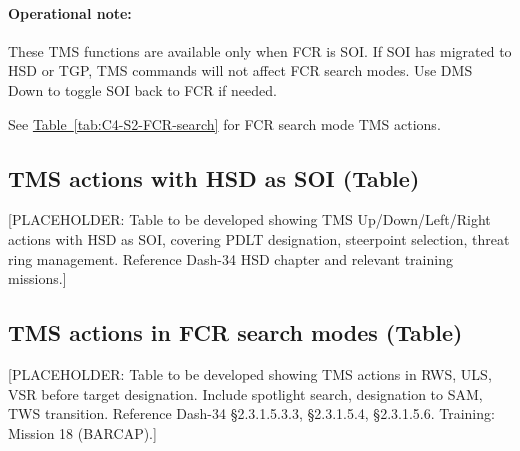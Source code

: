 \documentclass[11pt, a4paper, twoside]{report}
\newenvironment{hotastable}[1]{%
	\footnotesize
	\setlength{\tabcolsep}{3pt}
	\renewcommand{\arraystretch}{1.35}
	\begin{longtable}{L{1.00cm} L{0.90cm} L{0.90cm} L{3.30cm} L{6.40cm} L{1.40cm} L{1.60cm}}
		\caption{#1}\label{table.\thetable}\\
		\noalign{\addtocontents{hotas}{\protect\contentsline{table}{\protect\numberline{\thetable}#1}{\thepage}{table.\thetable}}}%
		\rowcolor{headerblue}
		\multicolumn{1}{>{\centering\arraybackslash}p{1.00cm}}{\textbf{\color{white}Mode}} &
		\multicolumn{1}{>{\centering\arraybackslash}p{0.90cm}}{\textbf{\color{white}Dir.}} &
		\multicolumn{1}{>{\centering\arraybackslash}p{0.90cm}}{\textbf{\color{white}Act.}} &
		\multicolumn{1}{>{\centering\arraybackslash}p{3.30cm}}{\textbf{\color{white}Function}} &
		\multicolumn{1}{>{\centering\arraybackslash}p{6.40cm}}{\textbf{\color{white}Effect / Nuance}} &
		\multicolumn{1}{>{\centering\arraybackslash}p{1.40cm}}{\textbf{\color{white}Dash34}} &
		\multicolumn{1}{>{\centering\arraybackslash}p{1.60cm}}{\textbf{\color{white}Train.}} \\
		\endfirsthead
		\rowcolor{headerblue}
		\multicolumn{1}{>{\centering\arraybackslash}p{1.00cm}}{\textbf{\color{white}Mode}} &
		\multicolumn{1}{>{\centering\arraybackslash}p{0.90cm}}{\textbf{\color{white}Dir.}} &
		\multicolumn{1}{>{\centering\arraybackslash}p{0.90cm}}{\textbf{\color{white}Act.}} &
		\multicolumn{1}{>{\centering\arraybackslash}p{3.30cm}}{\textbf{\color{white}Function}} &
		\multicolumn{1}{>{\centering\arraybackslash}p{6.40cm}}{\textbf{\color{white}Effect / Nuance}} &
		\multicolumn{1}{>{\centering\arraybackslash}p{1.40cm}}{\textbf{\color{white}Dash34}} &
		\multicolumn{1}{>{\centering\arraybackslash}p{1.60cm}}{\textbf{\color{white}Train.}} \\
		\endhead
		\multicolumn{7}{r}{\small\emph{Continued on next page}}\\
		\endfoot
		\endlastfoot
	}{%
	\end{longtable}
}
\newcommand{\tabref}[1]{\hyperref[#1]{Table~\ref*{#1}}}
\begin{document}
\paragraph{Operational note:}
These TMS functions are available only when FCR is SOI. If SOI has migrated to HSD or TGP, TMS commands will not affect FCR search modes. Use DMS Down to toggle SOI back to FCR if needed.

See \tabref{tab:C4-S2-FCR-search} for FCR search mode TMS actions.

\subsection{TMS actions with HSD as SOI (Table)}
\label{sec:C4-S2-S3}

[PLACEHOLDER: Table to be developed showing TMS Up/Down/Left/Right actions with HSD as SOI, covering PDLT designation, steerpoint selection, threat ring management. Reference Dash-34 HSD chapter and relevant training missions.]


\subsection{TMS actions in FCR search modes (Table)}
\label{sec:C4-S2-S4}

[PLACEHOLDER: Table to be developed showing TMS actions in RWS, ULS, VSR before target designation. Include spotlight search, designation to SAM, TWS transition. Reference Dash-34 §2.3.1.5.3.3, §2.3.1.5.4, §2.3.1.5.6. Training: Mission 18 (BARCAP).]

\end{document}
